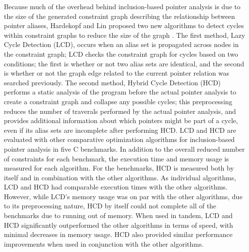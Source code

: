 Because much of the overhead behind inclusion-based pointer analysis is due to the size of the generated constraint graph describing the relationship between pointer aliases, Hardekopf and Lin proposed two new algorithms to detect cycles within constraint graphs to reduce the size of the graph \cite{Hardekopf}. The first method, Lazy Cycle Detection (LCD), occurs when an alias set is propagated across nodes in the constraint graph; LCD checks the constraint graph for cycles based on two conditions; the first is whether or not two alias sets are identical, and the second is whether or not the graph edge related to the current pointer relation was searched previously. The second method, Hybrid Cycle Detection (HCD) performs a static analysis of the program before the actual pointer analysis to create a constraint graph and collapse any possible cycles; this preprocessing reduces the number of traverals performed by the actual pointer analysis, and provides additional information about which pointers might be part of a cycle, even if its alias sets are incomplete after performing HCD. LCD and HCD are evaluated with other comparative optimization algorithms for inclusion-based pointer analysis in five C benchmarks. In addition to the overall reduced number of constraints for each benchmark, the execution time and memory usage is measured for each algorithm. For the benchmarks, HCD is measured both by itself and in combination with the other algorithms. As individual algorithms, LCD and HCD had comparable execution times with the other algorithms. However, while LCD's memory usage was on par with the other algorithms, due to its preprocessing nature, HCD by itself could not complete all of the benchmarks due to running out of memory. When used in tandem, LCD and HCD significantly outperformed the other algorithms in terms of speed, with minimal decreases in memory usage. HCD also provided similar performance improvements when used in conjunction with the other algorithms.

